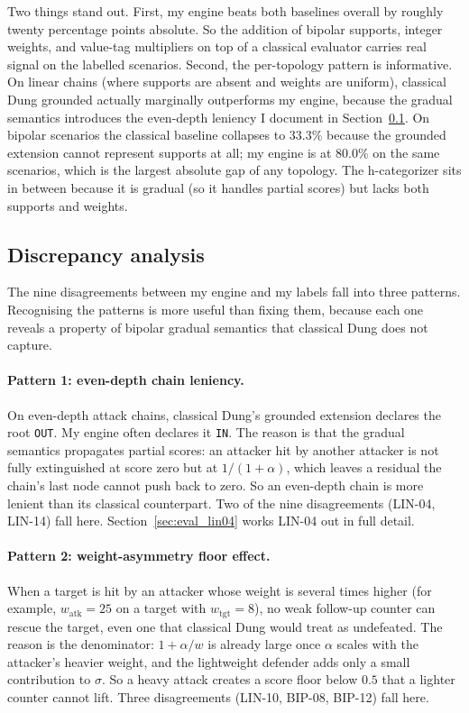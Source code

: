 Two things stand out. First, my engine beats both baselines overall by roughly twenty percentage points absolute. So the addition of bipolar supports, integer weights, and value-tag multipliers on top of a classical evaluator carries real signal on the labelled scenarios. Second, the per-topology pattern is informative. On linear chains (where supports are absent and weights are uniform), classical Dung grounded actually marginally outperforms my engine, because the gradual semantics introduces the even-depth leniency I document in Section~\ref{sec:eval_discrepancy}. On bipolar scenarios the classical baseline collapses to $33.3\%$ because the grounded extension cannot represent supports at all; my engine is at $80.0\%$ on the same scenarios, which is the largest absolute gap of any topology. The h-categorizer sits in between because it is gradual (so it handles partial scores) but lacks both supports and weights.

\subsection{Discrepancy analysis}
\label{sec:eval_discrepancy}
The nine disagreements between my engine and my labels fall into three patterns. Recognising the patterns is more useful than fixing them, because each one reveals a property of bipolar gradual semantics that classical Dung does not capture.

\paragraph{Pattern 1: even-depth chain leniency.}
On even-depth attack chains, classical Dung's grounded extension declares the root \texttt{OUT}. My engine often declares it \texttt{IN}. The reason is that the gradual semantics propagates partial scores: an attacker hit by another attacker is not fully extinguished at score zero but at $1/(1+\alpha)$, which leaves a residual the chain's last node cannot push back to zero. So an even-depth chain is more lenient than its classical counterpart. Two of the nine disagreements (LIN-04, LIN-14) fall here. Section~\ref{sec:eval_lin04} works LIN-04 out in full detail.

\paragraph{Pattern 2: weight-asymmetry floor effect.}
When a target is hit by an attacker whose weight is several times higher (for example, $w_{\text{atk}}=25$ on a target with $w_{\text{tgt}}=8$), no weak follow-up counter can rescue the target, even one that classical Dung would treat as undefeated. The reason is the denominator: $1 + \alpha/w$ is already large once $\alpha$ scales with the attacker's heavier weight, and the lightweight defender adds only a small contribution to $\sigma$. So a heavy attack creates a score floor below $0.5$ that a lighter counter cannot lift. Three disagreements (LIN-10, BIP-08, BIP-12) fall here.

